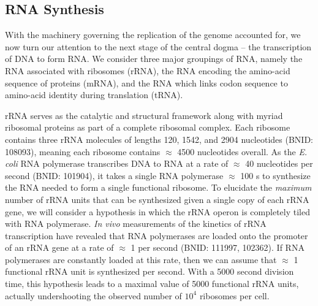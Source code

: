 \subsection{RNA Synthesis}\label{sec:RNA_synthesis}
With the machinery governing the replication of the genome accounted for, we
now turn our attention to the next stage of the central dogma -- the
transcription of DNA to form RNA. We consider three major groupings
of RNA, namely the RNA associated with ribosomes (rRNA), the RNA encoding the
amino-acid sequence of proteins (mRNA), and the RNA which links codon
sequence to amino-acid identity during translation (tRNA).

rRNA serves as the catalytic and structural
framework along with myriad ribosomal proteins as part of a complete ribosomal complex.
Each ribosome contains three rRNA molecules of lengths 120, 1542,
and 2904 nucleotides (BNID: 108093), meaning each ribosome
contains $\approx$ 4500 nucleotides overall. As the \textit{E. coli} RNA polymerase
transcribes DNA to RNA at a rate of $\approx$ 40 nucleotides per second
(BNID: 101904), it takes a single RNA polymerase
$\approx$ 100 s to synthesize the RNA needed to form a single functional ribosome.
To elucidate the \textit{maximum} number of rRNA units that can
be synthesized given a single copy of each rRNA gene, we will consider a
hypothesis in which the rRNA operon is completely tiled with RNA polymerase.
\textit{In vivo} measurements of the kinetics of rRNA transcription have revealed that
RNA polymerases are loaded onto the promoter of an rRNA gene at a rate of
$\approx$ 1 per second (BNID: 111997, 102362). If RNA
polymerases are constantly loaded at this rate,
then we can assume that $\approx$ 1 functional rRNA unit is
synthesized per second. With a 5000 second division time, this hypothesis
leads to a maximal value of 5000 functional rRNA units, actually undershooting
the observed number of $10^4$ ribosomes per cell.

